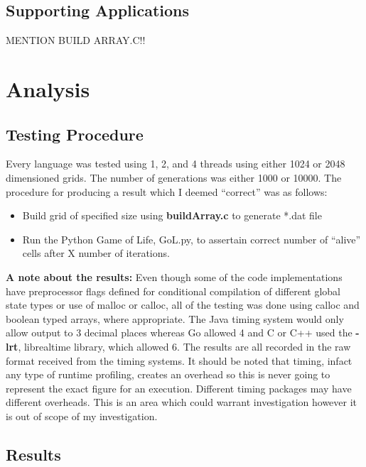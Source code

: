 \documentclass[11pt]{article} %
\begin{document}
\subsection{Supporting Applications}
MENTION BUILD ARRAY.C!!

\section{Analysis}
\subsection{Testing Procedure}
Every language was tested using 1, 2, and 4 threads using either 1024 or 2048 dimensioned grids. The number of generations was either 1000 or 10000. The procedure for producing a result which I deemed ``correct'' was as follows:
\begin{itemize}
\item Build grid of specified size using {\bf buildArray.c} to generate *.dat file
\item Run the Python Game of Life, GoL.py, to assertain correct number of ``alive'' cells after X number of iterations.
\end{itemize}
{\bf A note about the results:} Even though some of the code implementations have preprocessor flags defined for conditional compilation of different global state types or use of malloc or calloc, all of the testing was done using calloc and boolean typed arrays, where appropriate. The Java timing system would only allow output to 3 decimal places whereas Go allowed 4 and C or C++ used the {\bf -lrt}, librealtime library, which allowed 6. The results are all recorded in the raw format received from the timing systems. It should be noted that timing, infact any type of runtime profiling, creates an overhead so this is never going to represent the exact figure for an execution. Different timing packages may have different overheads. This is an area which could warrant investigation however it is out of scope of my investigation.
\subsection{Results}
\end{document}
